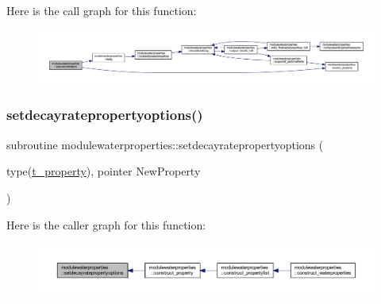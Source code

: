 Here is the call graph for this function\+:\nopagebreak
\begin{figure}[H]
\begin{center}
\leavevmode
\includegraphics[width=350pt]{namespacemodulewaterproperties_aea5dfa662931ed10a0e9543a5150c9b5_cgraph}
\end{center}
\end{figure}
\mbox{\label{namespacemodulewaterproperties_a9b03fe6ccf9de1a1c29846e4a8104c87}} 
\subsubsection{\texorpdfstring{setdecayratepropertyoptions()}{setdecayratepropertyoptions()}}
{\footnotesize\ttfamily subroutine modulewaterproperties\+::setdecayratepropertyoptions (\begin{DoxyParamCaption}\item[{type(\mbox{\hyperlink{structmodulewaterproperties_1_1t__property}{t\+\_\+property}}), pointer}]{New\+Property }\end{DoxyParamCaption})\hspace{0.3cm}{\ttfamily [private]}}

Here is the caller graph for this function\+:\nopagebreak
\begin{figure}[H]
\begin{center}
\leavevmode
\includegraphics[width=350pt]{namespacemodulewaterproperties_a9b03fe6ccf9de1a1c29846e4a8104c87_icgraph}
\end{center}
\end{figure}
\mbox{\label{namespacemodulewaterproperties_a0e9ad0864f289819d005ffe929ac3f86}} 

